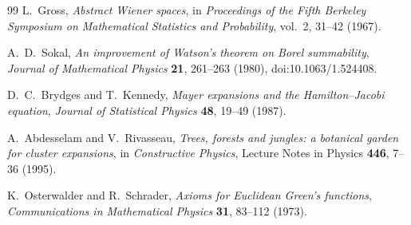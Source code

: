 \documentclass[11pt]{article}
\begin{document}
\begin{thebibliography}{99}
L.~Gross, \emph{Abstract Wiener spaces}, in \emph{Proceedings of the Fifth Berkeley
Symposium on Mathematical Statistics and Probability}, vol.~2, 31--42 (1967).

A.~D.~Sokal, \emph{An improvement of Watson's theorem on Borel summability},
\emph{Journal of Mathematical Physics} \textbf{21}, 261--263 (1980),
doi:10.1063/1.524408.

D.~C.~Brydges and T.~Kennedy, \emph{Mayer expansions and the Hamilton--Jacobi equation},
\emph{Journal of Statistical Physics} \textbf{48}, 19--49 (1987).

A.~Abdesselam and V.~Rivasseau, \emph{Trees, forests and jungles: a botanical garden
for cluster expansions}, in \emph{Constructive Physics}, Lecture Notes in Physics
\textbf{446}, 7--36 (1995).

K.~Osterwalder and R.~Schrader, \emph{Axioms for Euclidean Green's functions},
\emph{Communications in Mathematical Physics} \textbf{31}, 83--112 (1973).
\end{thebibliography}
\end{document}
